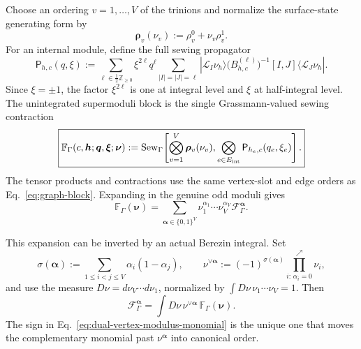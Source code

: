 \documentclass[11pt]{article}
\newcommand{\F}{\mathcal F}
\newcommand{\half}{\tfrac12}
\begin{document}
Choose an ordering \(v=1,\ldots,V\) of the trinions and normalize the
surface-state generating form by
\begin{equation}
 \boldsymbol\rho_v(\nu_v)
 :=\rho_v^0+\nu_v\rho_v^1.
 \label{eq:superpants-generating-form}
\end{equation}
For an internal module, define the full sewing propagator
\begin{equation}
 \mathsf P_{h,c}(q,\xi)
 :=\sum_{\ell\in\half\mathbb Z_{\ge0}}
  \xi^{2\ell}q^\ell
  \sum_{|I|=|J|=\ell}
  |\mathcal L_I\nu_h\rangle
  \bigl(B_{h,c}^{(\ell)}\bigr)^{-1}[I,J]
  \langle\mathcal L_J\nu_h|.
 \label{eq:ns-super-propagator}
\end{equation}
Since \(\xi=\pm1\), the factor \(\xi^{2\ell}\) is one at integral level and
\(\xi\) at half-integral level.  The unintegrated supermoduli block is the
single Grassmann-valued sewing contraction
\begin{equation}
\boxed{
 \mathbb F_\Gamma
 (c,\bm h;\bm q,\bm\xi;\bm\nu)
 :=\operatorname{Sew}_\Gamma\!\left[
   \bigotimes_{v=1}^{V}\boldsymbol\rho_v(\nu_v),
   \bigotimes_{e\in E_{\rm int}}
   \mathsf P_{h_e,c}(q_e,\xi_e)
 \right].}
 \label{eq:supermoduli-generating-block}
\end{equation}
The tensor products and contractions use the same vertex-slot and edge
orders as Eq.~\eqref{eq:graph-block}.  Expanding in the genuine odd moduli
gives
\begin{equation}
 \mathbb F_\Gamma(\bm\nu)
 =\sum_{\bm\alpha\in\{0,1\}^{V}}
 \nu_1^{\alpha_1}\cdots\nu_V^{\alpha_V}
 \F_\Gamma^{\bm\alpha}.
 \label{eq:supermoduli-component-expansion}
\end{equation}

This expansion can be inverted by an actual Berezin integral.  Set
\begin{equation}
 \sigma(\bm\alpha)
 :=\sum_{1\le i<j\le V}\alpha_i(1-\alpha_j),
 \qquad
 \nu^{\vee\bm\alpha}
 :=(-1)^{\sigma(\bm\alpha)}
   \prod_{i:\,\alpha_i=0}^{\nearrow}\nu_i,
 \label{eq:dual-vertex-modulus-monomial}
\end{equation}
and use the measure \(D\nu=d\nu_V\cdots d\nu_1\), normalized by
\(\int D\nu\,\nu_1\cdots\nu_V=1\).  Then
\begin{equation}
\boxed{
 \F_\Gamma^{\bm\alpha}
 =\int D\nu\,
   \nu^{\vee\bm\alpha}\,
   \mathbb F_\Gamma(\bm\nu).}
 \label{eq:component-block-supermoduli-integral}
\end{equation}
The sign in Eq.~\eqref{eq:dual-vertex-modulus-monomial} is the unique one
that moves the complementary monomial past
\(\nu^{\bm\alpha}\) into canonical order.
\end{document}
